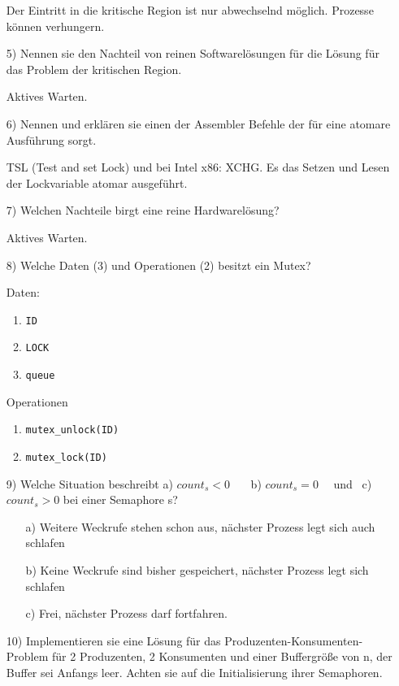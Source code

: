 \documentclass[11pt,a4paper]{article}
\begin{document}
\begin{itemize}
Der Eintritt in die kritische Region ist nur abwechselnd möglich. Prozesse können verhungern.

\item[5)] Nennen sie den Nachteil von reinen Softwarelösungen für die Lösung für das Problem der kritischen Region.

Aktives Warten.
\item[6)] Nennen und erklären sie einen der Assembler Befehle der für eine atomare Ausführung sorgt.

TSL (Test and set Lock) und bei Intel x86: XCHG. Es das Setzen und Lesen der Lockvariable atomar ausgeführt.
\item[7)] Welchen Nachteile birgt eine reine Hardwarelösung?

Aktives Warten.



\pagebreak


\item[8)] Welche Daten (3) und Operationen (2) besitzt ein Mutex?

Daten:
\begin{enumerate}
\item \texttt{ID}
\item \texttt{LOCK}
\item \texttt{queue}
\end{enumerate}

Operationen
\begin{enumerate}
\item \texttt{mutex\_unlock(ID)}
\item \texttt{mutex\_lock(ID)}
\end{enumerate}
\item[9)] Welche Situation beschreibt a) \texttt{$count_s < 0$} \ \ \ b) \texttt{$count_s = 0$} \ \ und \ c)  \texttt{$count_s > 0$} bei einer Semaphore s?

\begin{itemize}
\item[a)] Weitere Weckrufe stehen schon aus, nächster Prozess legt sich auch schlafen
\item[b)] Keine Weckrufe sind bisher gespeichert, nächster Prozess legt sich schlafen
\item[c)] Frei, nächster Prozess darf fortfahren.
\end{itemize}

\item[10)] Implementieren sie eine Lösung für das Produzenten-Konsumenten-Problem für 2 Produzenten, 2 Konsumenten und einer Buffergröße von n, der Buffer sei Anfangs leer. Achten sie auf die Initialisierung ihrer Semaphoren.


\end{itemize}
\end{document}

